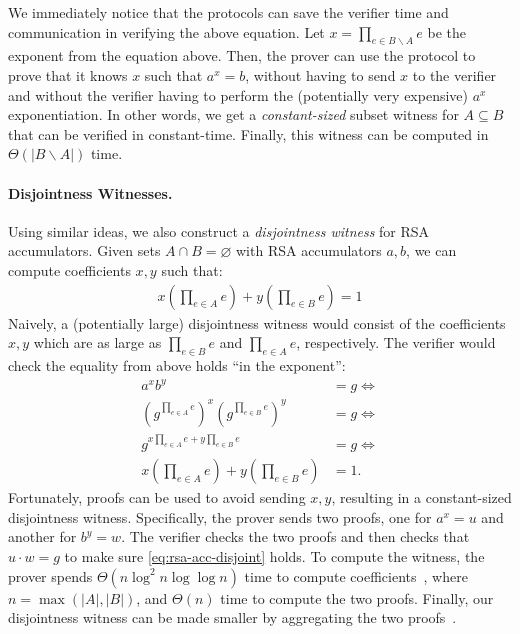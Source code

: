 We immediately notice that the \poketwo protocols can save the verifier time and communication in verifying the above equation.
Let $x=\prod_{e\in{B\backslash A}} e$ be the exponent from the equation above.
Then, the prover can use the \poketwo protocol to prove that it knows $x$ such that $a^x = b$, without having to send $x$ to the verifier and without the verifier having to perform the (potentially very expensive) $a^x$ exponentiation.
In other words, we get a \textit{constant-sized} subset witness for $A \subseteq B$ that can be verified in constant-time.
Finally, this witness can be computed in $\Theta(|B\backslash A|)$ time.

\paragraph{Disjointness Witnesses.}
Using similar ideas, we also construct a \textit{disjointness witness} for RSA accumulators.
Given sets $A\cap B=\varnothing$ with RSA accumulators $a,b$, we can compute \bezout coefficients $x,y$ such that:
\begin{align*}
    x \left(\prod_{e\in A} e\right) + y \left(\prod_{e\in B} e\right) = 1
\end{align*}
Naively, a (potentially large) disjointness witness would consist of the \bezout coefficients $x,y$ which are as large as $\prod_{e\in B} e$ and $\prod_{e\in A} e$, respectively.
The verifier would check the equality from above holds ``in the exponent'':
\begin{align}
    a^{x} b^{y} &= g\Leftrightarrow\\
    \label{eq:rsa-acc-disjoint}
    \left(g^{\prod_{e\in A} e}\right)^x \left(g^{\prod_{e\in B} e}\right)^y &= g\Leftrightarrow\\
    g^{x\prod_{e\in A} e + y\prod_{e\in B} e} &= g\Leftrightarrow\\
    x \left(\prod_{e\in A} e\right) + y \left(\prod_{e\in B} e\right) &= 1.
\end{align}
Fortunately, \poketwo proofs can be used to avoid sending $x, y$, resulting in a constant-sized disjointness witness.
Specifically, the prover sends two \poketwo proofs, one for $a^x = u$ and another for $b^y = w$.
The verifier checks the two \poketwo proofs and then checks that $u\cdot w = g$ to make sure \cref{eq:rsa-acc-disjoint} holds.
To compute the witness, the prover spends $\Theta(n\log^2{n}\log\log{n})$ time to compute \bezout coefficients~\cite{Schonhage71}, where $n=\max(|A|,|B|)$, and $\Theta(n)$ time to compute the two \poketwo proofs.
Finally, our disjointness witness can be made smaller by aggregating the two \poketwo proofs~\cite{BBF18}.

